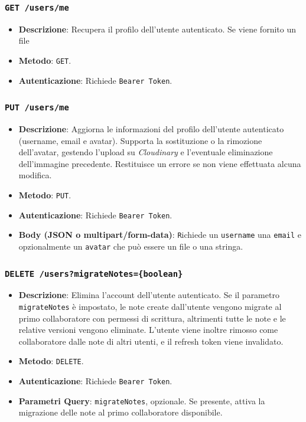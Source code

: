 \documentclass[11pt]{article}
\begin{document}
\subsubsection{\texttt{GET /users/me}}
\begin{itemize}
    \item \textbf{Descrizione}: Recupera il profilo dell'utente autenticato. Se viene fornito un file 
    \item \textbf{Metodo}: \texttt{GET}.
    \item \textbf{Autenticazione}: Richiede \texttt{Bearer Token}.
\end{itemize}

\subsubsection{\texttt{PUT /users/me}}
\begin{itemize}
    \item \textbf{Descrizione}: Aggiorna le informazioni del profilo dell’utente autenticato (username, email e avatar). 
    Supporta la sostituzione o la rimozione dell’avatar, gestendo l’upload su \textit{Cloudinary} e l’eventuale eliminazione dell’immagine precedente. 
    Restituisce un errore se non viene effettuata alcuna modifica.
    \item \textbf{Metodo}: \texttt{PUT}.
    \item \textbf{Autenticazione}: Richiede \texttt{Bearer Token}.
    \item \textbf{Body (JSON o multipart/form-data)}: \texttt Richiede un \texttt{username} una \texttt{email} e opzionalmente un \texttt{avatar} che può essere un file o una stringa.
\end{itemize}

\subsubsection{\texttt{DELETE /users?migrateNotes=\{boolean\}}}
\begin{itemize}
    \item \textbf{Descrizione}: Elimina l’account dell’utente autenticato. 
    Se il parametro \texttt{migrateNotes} è impostato, le note create dall’utente vengono migrate al primo collaboratore con permessi di scrittura, altrimenti tutte le note e le relative versioni vengono eliminate. 
    L’utente viene inoltre rimosso come collaboratore dalle note di altri utenti, e il refresh token viene invalidato.
    \item \textbf{Metodo}: \texttt{DELETE}.
    \item \textbf{Autenticazione}: Richiede \texttt{Bearer Token}.
    \item \textbf{Parametri Query}: \texttt{migrateNotes}, opzionale. Se presente, attiva la migrazione delle note al primo collaboratore disponibile.
\end{itemize}
\end{document}
